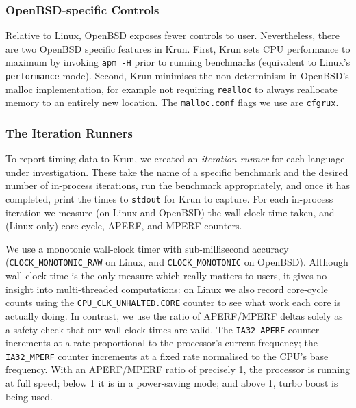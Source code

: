 \documentclass[acmsmall,screen]{acmart}
\newcommand{\krun}{Krun\xspace}
\begin{document}
\subsubsection{OpenBSD-specific Controls}

Relative to Linux, OpenBSD exposes fewer controls to user. Nevertheless,
there are two OpenBSD specific features in \krun.
First, \krun sets CPU performance to maximum by invoking \texttt{apm -H} prior
to running benchmarks (equivalent to Linux's \texttt{performance} mode).
Second, \krun minimises the non-determinism in OpenBSD's malloc implementation,
for example not requiring \texttt{realloc} to always reallocate memory to
an entirely new location. The \texttt{malloc.conf} flags we use are \texttt{cfgrux}.


\subsubsection{The Iteration Runners}

To report timing data to \krun, we created an
\emph{iteration runner} for each language under investigation.
These take the name of a specific benchmark and
the desired number of in-process iterations, run the benchmark appropriately,
and once it has completed, print the times to \texttt{stdout} for \krun to
capture. For each in-process iteration we
measure (on Linux and OpenBSD) the wall-clock time taken, and (Linux only) core
cycle, APERF, and MPERF counters.

We use a monotonic wall-clock timer with sub-millisecond accuracy
(\texttt{CLOCK\_MONOTONIC\_RAW} on Linux, and \texttt{CLOCK\-\_MONOTONIC} on
OpenBSD). Although wall-clock time is the only measure which really matters to
users, it gives no insight into multi-threaded computations: on Linux we also record
core-cycle counts using the \texttt{CPU\-\_CLK\-\_UNHALTED\-.CORE} counter to see
what work each core is actually doing. In contrast, we use the ratio of APERF/MPERF deltas
solely as a safety check that our wall-clock times are valid.
The \texttt{IA32\_APERF} counter increments at a rate proportional to the
processor's current frequency; the \texttt{IA32\_MPERF} counter increments at a fixed
rate normalised to the CPU's base frequency. With an APERF/MPERF ratio of
precisely 1, the processor is running at full speed; below 1 it is in
a power-saving mode; and above 1, turbo boost is being used.
\end{document}
